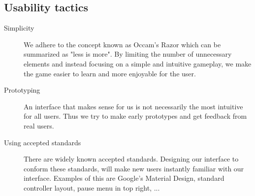 	\subsection{Usability tactics}
		\begin{description}
			\item[Simplicity]
			We adhere to the concept known as Occam's Razor which can be summarized as "less is more". By limiting the number of unnecessary elements and instead focusing on a simple and intuitive gameplay, we make the game easier to learn and more enjoyable for the user.
			
			\item[Prototyping]
			An interface that makes sense for us is not necessarily the most intuitive for all users. Thus we try to make early prototypes and get feedback from real users.
			
			\item[Using accepted standards]
			There are widely known accepted standards. Designing our interface to conform these standards, will make new users instantly familiar with our interface. Examples of this are Google's Material Design, standard controller layout, pause menu in top right, ...
			
		\end{description}